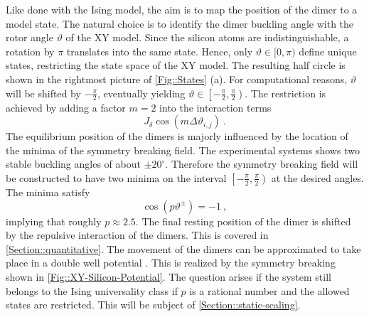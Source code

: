 	Like done with the Ising model, the aim is to map the position of the dimer to a model state. The natural choice is to identify the dimer buckling angle with the rotor angle $\vartheta$ of the XY model. Since the silicon atoms are indistinguishable, a rotation by $\pi$ translates into the same state. Hence, only $\vartheta \in [0, \pi)$ define unique states, restricting the state space of the XY model. The resulting half circle is shown in the rightmost picture of \autoref{Fig::States} (a). For computational reasons, $\vartheta $ will be shifted by $-\tfrac{\pi}{2}$, eventually yielding $\vartheta \in \left[-\tfrac{\pi}{2}, \tfrac{\pi}{2}\right)$. The restriction is achieved by adding a factor $m=2$ into the interaction terms 
	\begin{equation}
		J_\delta \cos \left(m \Delta \vartheta_{i, j}\right)~.
	\end{equation}
	The equilibrium position of the dimers is majorly influenced by the location of the minima of the symmetry breaking field. The experimental systems shows two stable buckling angles of about $\pm 20^\circ$. Therefore the symmetry breaking field will be constructed to have two minima on the interval $\left[-\tfrac{\pi}{2}, \tfrac{\pi}{2}\right)$ at the desired angles. The minima satisfy
	\begin{equation}
		\cos \left(p \vartheta^\pm\right) =	-1~,
	\end{equation}
	implying that roughly $ p \approx 2.5$. The final resting position of the dimer is shifted by the repulsive interaction of the dimers. This is covered in \autoref{Section::quantitative}. The movement of the dimers can be approximated to take place in a double well potential \cite{dabrowski1992self}. This is realized by the symmetry breaking shown in \autoref{Fig::XY-Silicon-Potential}. The question arises if the system still belongs to the Ising universality class if $p$ is a rational number and the allowed states are restricted. This will be subject of \autoref{Section::static-scaling}. \\
	
